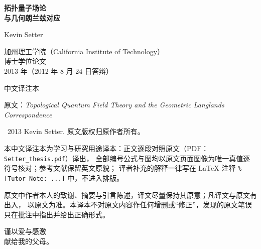 \begin{titlepage}
\centering
\vspace*{2.2cm}
{\Huge\bfseries 拓扑量子场论\\[0.35em] 与几何朗兰兹对应}\par
\vspace{2.4cm}
{\LARGE Kevin Setter}\par
\vspace{1.4cm}
{\large 加州理工学院（California Institute of Technology）\\[0.4em]
博士学位论文\\[0.4em]
2013 年（2012 年 8 月 24 日答辩）}\par
\vfill
{\large 中文译注本}\par
\vspace{0.3cm}
{\small 原文：\emph{Topological Quantum Field Theory and the Geometric Langlands Correspondence}}
\end{titlepage}

\clearpage
\thispagestyle{empty}
\null\vfill
\begin{flushleft}
\textcopyright\ 2013 Kevin Setter. 原文版权归原作者所有。\par
\medskip
本中文译注本为学习与研究用途译本：正文逐段对照原文（PDF：\texttt{Setter\_thesis.pdf}）译出，
全部编号公式与图均以原文页面图像为唯一真值逐符号核对；参考文献保留英文原貌；
译者补充的解释一律写在 LaTeX 注释 \verb|% [Tutor Note: ...]| 中，不进入排版。\par
\medskip
原文中作者本人的致谢、摘要与引言陈述，译文尽量保持其原意；凡译文与原文有出入，
以原文为准。本译本不对原文内容作任何增删或“修正”，发现的原文笔误只在批注中指出并给出正确形式。\par
\end{flushleft}
\vspace{2cm}

\clearpage
\thispagestyle{empty}
\null\vspace{3cm}
\begin{center}
{\large 谨以爱与感激\\[0.6em] 献给我的父母。}
\end{center}
\vfill
